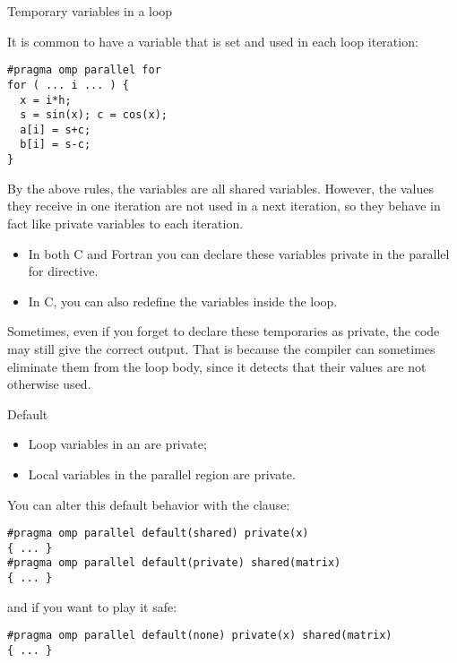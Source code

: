  {Temporary variables in a loop}

It is common to have a variable that is set and used in each loop
iteration:
\begin{lstlisting}
#pragma omp parallel for
for ( ... i ... ) {
  x = i*h;
  s = sin(x); c = cos(x);
  a[i] = s+c;
  b[i] = s-c;
}
\end{lstlisting}
By the above rules, the variables  are all shared
variables. However, the values they receive in one iteration are not
used in a next iteration, so they behave in fact like private
variables to each iteration.
\begin{itemize}
\item In both C and Fortran you can declare these variables private in
  the parallel for directive.
\item In C, you can also redefine the variables inside the loop.
\end{itemize}

Sometimes, even if you forget to declare these temporaries as private,
the code may still give the correct output. That is because the
compiler can sometimes eliminate them from the loop body, since it detects that their
values are not otherwise used.

 {Default}

\begin{itemize}
\item Loop variables in an  are private;
\item Local variables in the parallel region are private.
\end{itemize}
You can alter this default behavior with the  clause:
\begin{lstlisting}
#pragma omp parallel default(shared) private(x)
{ ... }
#pragma omp parallel default(private) shared(matrix)
{ ... }
\end{lstlisting}
and if you want to play it safe:
\begin{lstlisting}
#pragma omp parallel default(none) private(x) shared(matrix)
{ ... }
\end{lstlisting}

